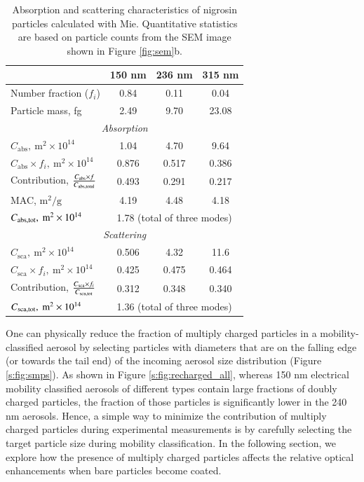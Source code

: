 \documentclass[12pt,authoryear]{elsarticle}
\begin{document}
\begin{table}[htp]
    \centering
    \caption{Absorption and scattering characteristics of nigrosin particles calculated with Mie. Quantitative statistics are based on particle counts from the SEM image shown in Figure \ref{fig:sem}b.}
    \begin{tabular}{l c c c}
        \hline
        & 150 nm & 236 nm & 315 nm \\
        \hline
        Number fraction ($f_i$) & 0.84 & 0.11 & 0.04 \\
        Particle mass, fg & 2.49 & 9.70 & 23.08 \\
        \multicolumn{4}{c}{\textit{Absorption}} \\
        \hline
        $C_{\mathrm{abs}},\ \mathrm{m}^2\times10^{14}$ & 1.04 & 4.70 & 9.64 \\
        $C_{\mathrm{abs}}\times f_i,\ \mathrm{m}^2\times10^{14}$ & 0.876 & 0.517 & 0.386 \\
        Contribution, $C_{\mathrm{abs}}\times f\over C_{\mathrm{abs,total}}$ & 0.493 & 0.291 & 0.217 \\
        MAC, $\mathrm{m}^2/\mathrm{g}$ & 4.19 & 4.48 & 4.18 \\
        $C_{\rm abs,tot},\ \rm m^2\times10^{14}$ & \multicolumn{3}{c}{1.78 (total of three modes)} \\
        \multicolumn{4}{c}{\textit{Scattering}} \\
        \hline
        $C_\mathrm{sca},\ \mathrm{m}^2\times 10^{14}$ & 0.506 & 4.32 & 11.6 \\
        $C_\mathrm{sca}\times f_i,\ \mathrm{m}^2\times 10^{14}$ & 0.425 & 0.475 & 0.464 \\
        Contribution, $C_\mathrm{sca}\times f_i\over C_\mathrm{sca,tot}$ & 0.312 & 0.348 & 0.340 \\
        $C_{\rm sca,tot},\ \rm m^2\times10^{14}$ & \multicolumn{3}{c}{1.36 (total of three modes)} \\
        \hline
    \end{tabular}
    \label{tab:absorption_mie}
\end{table}

One can physically reduce the fraction of multiply charged particles in a mobility-classified aerosol by selecting particles with diameters that are on the falling edge (or towards the tail end) of the incoming aerosol size distribution (Figure \ref{s:fig:smps}). As shown in Figure \ref{s:fig:recharged_all}, whereas 150 nm electrical mobility classified aerosols of different types contain large fractions of doubly charged particles, the fraction of those particles is significantly lower in the 240 nm aerosols. Hence, a simple way to minimize the contribution of multiply charged particles during experimental measurements is by carefully selecting the target particle size during mobility classification. In the following section, we explore how the presence of multiply charged particles affects the relative optical enhancements when bare particles become coated.
\end{document}
